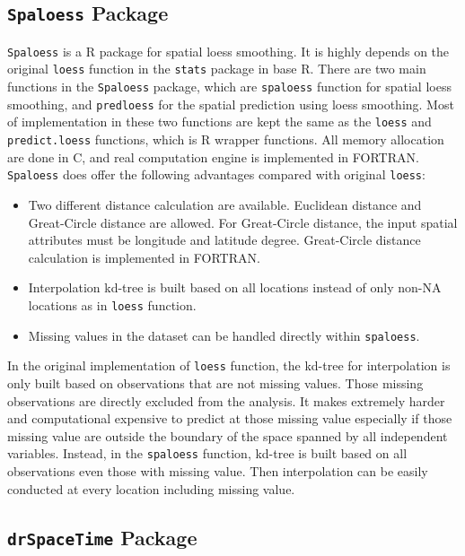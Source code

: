 \subsection{\texttt{Spaloess} Package}

\texttt{Spaloess} is a R package for spatial loess smoothing. It is highly 
depends on the original \texttt{loess} function in the \texttt{stats} package
in base R. There are two main functions in the \texttt{Spaloess} package, which 
are \texttt{spaloess} function for spatial loess smoothing, and \texttt{predloess} 
for the spatial prediction using loess smoothing. Most of implementation in these
two functions are kept the same as the \texttt{loess} and \texttt{predict.loess}
functions, which is R wrapper functions. All memory allocation are done in 
C, and real computation engine is implemented in FORTRAN. \texttt{Spaloess} does
offer the following advantages compared with original \texttt{loess}:

\begin{itemize}
\item Two different distance calculation are available. Euclidean distance and 
Great-Circle distance are allowed. For Great-Circle distance, the input spatial 
attributes must be longitude and latitude degree. Great-Circle distance 
calculation is implemented in FORTRAN.
\item Interpolation kd-tree is built based on all locations instead of only 
non-NA locations as in \texttt{loess} function. 
\item Missing values in the dataset can be handled directly within 
\texttt{spaloess}. 
\end{itemize}

In the original implementation of \texttt{loess} function, the kd-tree 
\cite{bentley1980multidimensional} for 
interpolation is only built based on observations that are not missing values. 
Those missing observations are directly excluded from the analysis. It makes 
extremely harder and computational expensive to predict at those missing value 
especially if those missing value are outside the boundary of the space spanned
by all independent variables. Instead, in the \texttt{spaloess} function, kd-tree 
is built based on all observations even those with missing value. Then 
interpolation can be easily conducted at every location including missing value.

\subsection{\texttt{drSpaceTime} Package}

